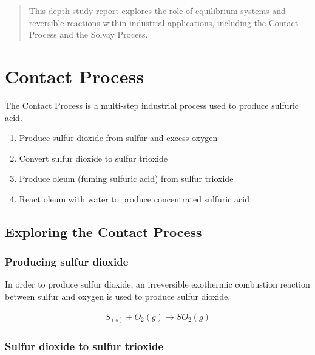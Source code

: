 \documentclass[12pt, a4paper]{article}
\begin{document}
\maketitle

\begin{abstract}
This depth study report explores the role of equilibrium systems and reversible reactions within industrial applications, including the Contact Process and the Solvay Process.
\end{abstract}




\section{Contact Process}

The Contact Process is a multi-step industrial process used to produce sulfuric acid. 

\begin{enumerate}
	\item Produce sulfur dioxide from sulfur and excess oxygen
	\item Convert sulfur dioxide to sulfur trioxide
	\item Produce oleum (fuming sulfuric acid) from sulfur trioxide
	\item React oleum with water to produce concentrated sulfuric acid
\end{enumerate}

\subsection{Exploring the Contact Process}

\subsubsection{Producing sulfur dioxide}

In order to produce sulfur dioxide, an irreversible exothermic combustion reaction between sulfur and oxygen is used to produce sulfur dioxide.

\begin{align}
	S_{(s)} + O_{2}(g) \rightarrow SO_{2}(g)
\end{align}

\subsubsection{Sulfur dioxide to sulfur trioxide}
\end{document}
